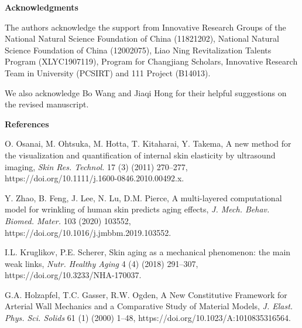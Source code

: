 \documentclass[11pt]{article}
\begin{document}
\vspace{0.5em}

\noindent\textbf{Acknowledgments}

\vspace{0.3em}

\noindent
The authors acknowledge the support from Innovative Research
Groups of the National Natural Science Foundation of China
(11821202), National Natural Science Foundation of China
(12002075), Liao Ning Revitalization Talents Program
(XLYC1907119), Program for Changjiang Scholars, Innovative
Research Team in University (PCSIRT) and 111 Project (B14013).

\noindent
We also acknowledge Bo Wang and Jiaqi Hong for their helpful
suggestions on the revised manuscript.

\vspace{0.5em}

\noindent\textbf{References}

\vspace{0.3em}

\begin{list}{}{%
  \setlength{\leftmargin}{2em}%
  \setlength{\itemindent}{-2em}%
  \setlength{\itemsep}{0.5em}%
  \setlength{\parsep}{0pt}%
}

\item [1] O. Osanai, M. Ohtsuka, M. Hotta, T. Kitaharai, Y.
Takema, A new method for the visualization and quantification
of internal skin elasticity by ultrasound imaging,
\emph{Skin Res. Technol.} 17 (3) (2011) 270--277,
https://doi.org/10.1111/j.1600-0846.2010.00492.x.

\item [2] Y. Zhao, B. Feng, J. Lee, N. Lu, D.M. Pierce, A
multi-layered computational model for wrinkling of human skin
predicts aging effects, \emph{J. Mech. Behav. Biomed. Mater.}
103 (2020) 103552, https://doi.org/10.1016/j.jmbbm.2019.103552.

\item [3] I.L. Kruglikov, P.E. Scherer, Skin aging as a
mechanical phenomenon: the main weak links, \emph{Nutr. Healthy
Aging} 4 (4) (2018) 291--307,
https://doi.org/10.3233/NHA-170037.

\item [4] G.A. Holzapfel, T.C. Gasser, R.W. Ogden, A New
Constitutive Framework for Arterial Wall Mechanics and a
Comparative Study of Material Models, \emph{J. Elast. Phys.
Sci. Solids} 61 (1) (2000) 1--48,
https://doi.org/10.1023/A:1010835316564.

\end{list}
\end{document}
